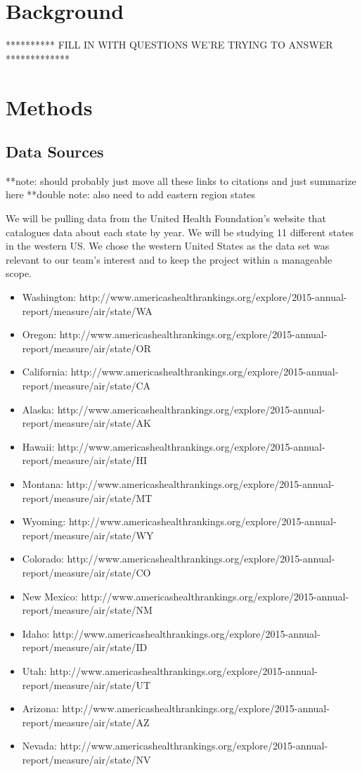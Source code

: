 \documentclass[journal]{vgtc}                %
\begin{document}
\section{Background}
********** FILL IN WITH QUESTIONS WE'RE TRYING TO ANSWER *************

\section{Methods}
\subsection{Data Sources}
**note: should probably just move all these links to citations and just summarize here
**double note: also need to add eastern region states


We will be pulling data from the United Health Foundation’s website that catalogues data about each state by year. We 
will be studying 11 different states in the western US. We chose the western United States as the data set was 
relevant to our team's interest and to keep the project within a manageable scope.
\begin{itemize}
\item Washington: 
http://www.americashealthrankings.org/explore/2015-annual-report/measure/air/state/WA
\item Oregon: http://www.americashealthrankings.org/explore/2015-annual-report/measure/air/state/OR
\item California: http://www.americashealthrankings.org/explore/2015-annual-report/measure/air/state/CA
\item Alaska: http://www.americashealthrankings.org/explore/2015-annual-report/measure/air/state/AK 
\item Hawaii: http://www.americashealthrankings.org/explore/2015-annual-report/measure/air/state/HI
\item Montana: http://www.americashealthrankings.org/explore/2015-annual-report/measure/air/state/MT
\item Wyoming: http://www.americashealthrankings.org/explore/2015-annual-report/measure/air/state/WY
\item Colorado: http://www.americashealthrankings.org/explore/2015-annual-report/measure/air/state/CO
\item New Mexico: http://www.americashealthrankings.org/explore/2015-annual-report/measure/air/state/NM
\item Idaho: http://www.americashealthrankings.org/explore/2015-annual-report/measure/air/state/ID
\item Utah: http://www.americashealthrankings.org/explore/2015-annual-report/measure/air/state/UT
\item Arizona: http://www.americashealthrankings.org/explore/2015-annual-report/measure/air/state/AZ
\item Nevada: http://www.americashealthrankings.org/explore/2015-annual-report/measure/air/state/NV 
\end{itemize}
\end{document}
